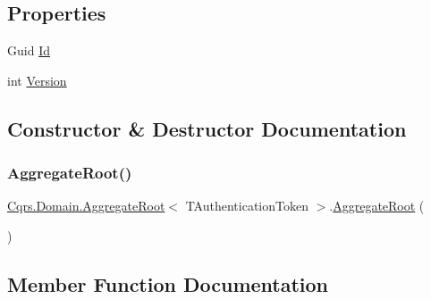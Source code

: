 \subsection*{Properties}
\begin{DoxyCompactItemize}
\item 
Guid \hyperlink{classCqrs_1_1Domain_1_1AggregateRoot_ab84d521c8c3bffd3c2e58959984d1e88_ab84d521c8c3bffd3c2e58959984d1e88}{Id}
\item 
int \hyperlink{classCqrs_1_1Domain_1_1AggregateRoot_a15f351663975c1d8e2cdc37b8c4d970f_a15f351663975c1d8e2cdc37b8c4d970f}{Version}
\end{DoxyCompactItemize}


\subsection{Constructor \& Destructor Documentation}
\mbox{\label{classCqrs_1_1Domain_1_1AggregateRoot_a1db2322dd7442e1e0c3c07332124eb2f_a1db2322dd7442e1e0c3c07332124eb2f}} 
\subsubsection{\texorpdfstring{Aggregate\+Root()}{AggregateRoot()}}
{\footnotesize\ttfamily \hyperlink{classCqrs_1_1Domain_1_1AggregateRoot}{Cqrs.\+Domain.\+Aggregate\+Root}$<$ T\+Authentication\+Token $>$.\hyperlink{classCqrs_1_1Domain_1_1AggregateRoot}{Aggregate\+Root} (\begin{DoxyParamCaption}{ }\end{DoxyParamCaption})\hspace{0.3cm}{\ttfamily [protected]}}



\subsection{Member Function Documentation}
\mbox{\label{classCqrs_1_1Domain_1_1AggregateRoot_a7e299b13c7556731e52670aa6d782296_a7e299b13c7556731e52670aa6d782296}} 
